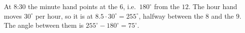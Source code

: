 At 8:30 the minute hand points at the $6$, i.e.\ $180^\circ$ from the $12$. The hour hand moves $30^\circ$ per hour, so it is at $8.5\cdot30^\circ=255^\circ$, halfway between the $8$ and the $9$. The angle between them is $255^\circ-180^\circ=\boxed{75^\circ}$.
